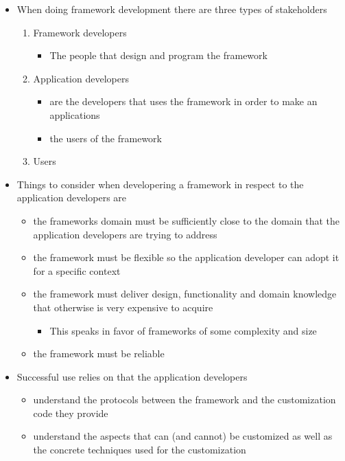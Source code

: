 \documentclass[11pt]{article}
\providecommand{\tightlist}{%
      \setlength{\itemsep}{0pt}\setlength{\parskip}{0pt}}
\begin{document}
\begin{itemize}
\tightlist
\item
  When doing framework development there are three types of stakeholders

  \begin{enumerate}
  \def\labelenumi{\arabic{enumi}.}
  \tightlist
  \item
    Framework developers

    \begin{itemize}
    \tightlist
    \item
      The people that design and program the framework
    \end{itemize}
  \item
    Application developers

    \begin{itemize}
    \tightlist
    \item
      are the developers that uses the framework in order to make an
      applications
    \item
      the users of the framework
    \end{itemize}
  \item
    Users
  \end{enumerate}
\item
  Things to consider when developering a framework in respect to the
  application developers are

  \begin{itemize}
  \tightlist
  \item
    the frameworks domain must be sufficiently close to the domain that
    the application developers are trying to address
  \item
    the framework must be flexible so the application developer can
    adopt it for a specific context
  \item
    the framework must deliver design, functionality and domain
    knowledge that otherwise is very expensive to acquire

    \begin{itemize}
    \tightlist
    \item
      This speaks in favor of frameworks of some complexity and size
    \end{itemize}
  \item
    the framework must be reliable
  \end{itemize}
\item
  Successful use relies on that the application developers

  \begin{itemize}
  \tightlist
  \item
    understand the protocols between the framework and the customization
    code they provide
  \item
    understand the aspects that can (and cannot) be customized as well
    as the concrete techniques used for the customization
  \end{itemize}
\end{itemize}
\end{document}
